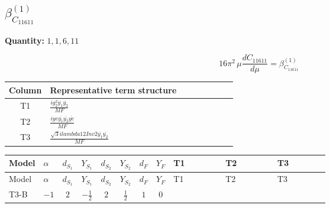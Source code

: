 \documentclass[8pt]{article}
\begin{document}
\begin{landscape}
\section*{$\beta_{C_{11611}}^{(1)}$}
\noindent\textbf{Quantity: }$\mathrm{1,1,6,11}$\par\smallskip
\[16\pi^2\,\mu\frac{d C_{11611}}{d\mu}=\beta_{C_{11611}}^{(1)}\]
\begin{center}
\begin{tabular}{@{}c >{\raggedright\arraybackslash}p{0.82\linewidth}@{}}
\toprule
Column & Representative term structure \\
\midrule
T1 & \(\displaystyle \frac{i g_{2}^{2} \overline{y_{1}} \overline{y_{2}}}{MF}\) \\
\midrule
T2 & \(\displaystyle \frac{i ye \overline{y_{1}} \overline{y_{2}} \overline{ye}}{MF}\) \\
\midrule
T3 & \(\displaystyle \frac{\sqrt{3} i lambda12Inv2 \overline{y_{1}} \overline{y_{2}}}{MF}\) \\
\midrule
\bottomrule
\end{tabular}
\end{center}
\smallskip
\tiny
\begin{longtable}{@{}llcccccc >{\raggedright\arraybackslash}p{0.21\linewidth} >{\raggedright\arraybackslash}p{0.21\linewidth} >{\raggedright\arraybackslash}p{0.21\linewidth}@{}}
\toprule
Model & $\alpha$ & $d_{S_1}$ & $Y_{S_1}$ & $d_{S_2}$ & $Y_{S_2}$ & $d_F$ & $Y_F$ & T1 & T2 & T3 \\
\midrule
\endfirsthead
\toprule
Model & $\alpha$ & $d_{S_1}$ & $Y_{S_1}$ & $d_{S_2}$ & $Y_{S_2}$ & $d_F$ & $Y_F$ & T1 & T2 & T3 \\
\midrule
\endhead
T3-B & $-1$ & $2$ & $-\frac{1}{2}$ & $2$ & $\frac{1}{2}$ & $1$ & $0$ & \scriptsize\adjustbox{max width=\linewidth}{$\begin{gathered} \frac{3 i g_{2}^{2} \overline{y_{1}} \overline{y_{2}}}{4 MF}\end{gathered}$} & \scriptsize\adjustbox{max width=\linewidth}{$\begin{gathered} - \frac{i ye \overline{y_{1}} \overline{y_{2}} \overline{ye}}{4 MF}\end{gathered}$} & \scriptsize\adjustbox{max width=\linewidth}{$\begin{gathered} \frac{\sqrt{3} i lambda12Inv2 \overline{y_{1}} \overline{y_{2}}}{3 MF}\end{gathered}$} \\
\midrule
\bottomrule
\end{longtable}
\clearpage

\end{landscape}
\end{document}

